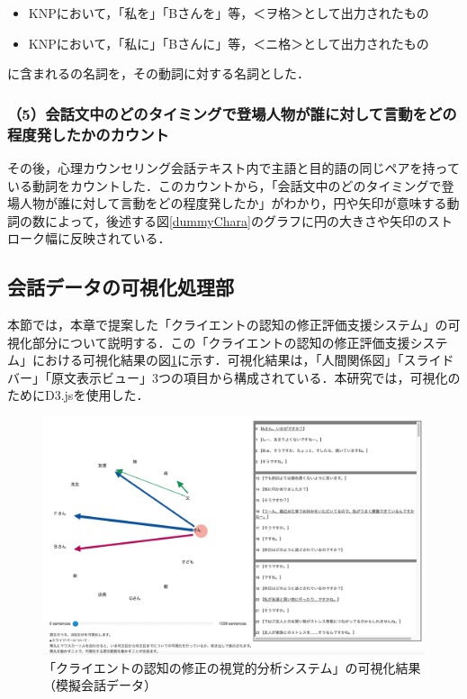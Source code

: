 \documentclass[shuuron]{kuee}
\begin{document}
\begin{itemize}

  \item KNPにおいて，「私を」「Bさんを」等，＜ヲ格＞として出力されたもの
  \item KNPにおいて，「私に」「Bさんに」等，＜ニ格＞として出力されたもの
\end{itemize}
に含まれるの名詞を，その動詞に対する名詞とした．

\subsubsection{（5）会話文中のどのタイミングで登場人物が誰に対して言動をどの程度発したかのカウント}

その後，心理カウンセリング会話テキスト内で主語と目的語の同じペアを持っている動詞をカウントした．このカウントから，「会話文中のどのタイミングで登場人物が誰に対して言動をどの程度発したか」がわかり，円や矢印が意味する動詞の数によって，後述する図\ref{dummyChara}のグラフに円の大きさや矢印のストローク幅に反映されている．


\subsection{会話データの可視化処理部}

本節では，本章で提案した「クライエントの認知の修正評価支援システム」の可視化部分について説明する．この「クライエントの認知の修正評価支援システム」における可視化結果の図\ref{fig:dummyChara}に示す．可視化結果は，「人間関係図」「スライドバー」「原文表示ビュー」3つの項目から構成されている．本研究では，可視化のためにD3.js\cite{vand3}を使用した．%

\begin{figure}
  \begin{center}
    \includegraphics[width=\linewidth]{dummyChara.png}
  \end{center}
  \caption{「クライエントの認知の修正の視覚的分析システム」の可視化結果（模擬会話データ）}
  \label{fig:dummyChara}
\end{figure}
\end{document}
